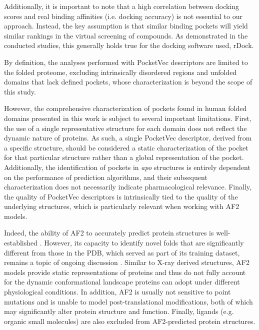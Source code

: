 Additionally, it is important to note that a high correlation between docking scores and real binding affinities (i.e. docking accuracy) is not essential to our approach. Instead, the key assumption is that similar binding pockets will yield similar rankings in the virtual screening of compounds. As demonstrated in the conducted studies, this generally holds true for the docking software used, rDock.

By definition, the analyses performed with PocketVec descriptors are limited to the folded proteome, excluding intrinsically disordered regions and unfolded domains that lack defined pockets, whose characterization is beyond the scope of this study. 


However, the comprehensive characterization of pockets found in human folded domains presented in this work is subject to several important limitations. First, the use of a single representative structure for each domain does not reflect the dynamic nature of proteins. As such, a single PocketVec descriptor, derived from a specific structure, should be considered a static characterization of the pocket for that particular structure rather than a global representation of the pocket. Additionally, the identification of pockets in \textit{apo} structures is entirely dependent on the performance of prediction algorithms, and their subsequent characterization does not necessarily indicate pharmacological relevance. Finally, the quality of PocketVec descriptors is intrinsically tied to the quality of the underlying structures, which is particularly relevant when working with AF2 models.

Indeed, the ability of AF2 to accurately predict protein structures is well-established \cite{jumper_highly_2021, tunyasuvunakool_highly_2021}. However, its capacity to identify novel folds that are significantly different from those in the PDB, which served as part of its training dataset, remains a topic of ongoing discussion \cite{akdel_structural_2022}. Similar to X-ray derived structures, AF2 models provide static representations of proteins and thus do not fully account for the dynamic conformational landscape proteins can adopt under different physiological conditions. In addition, AF2 is usually not sensitive to point mutations and is unable to model post-translational modifications, both of which may significantly alter protein structure and function. Finally, ligands (e.g. organic small molecules) are also excluded from AF2-predicted protein structures.

